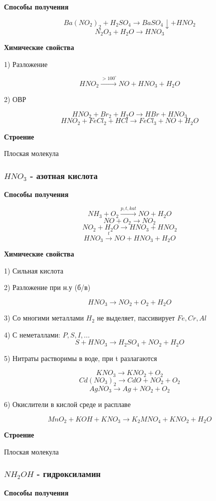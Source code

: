 \textbf{Способы получения}

$$Ba(NO_2)_2 + H_2SO_4 \rightarrow BaSO_4\downarrow + HNO_2$$
$$N_2O_3 + H_2O \rightarrow HNO_3$$

\textbf{Химические свойства}

1) Разложение

$$HNO_2 \xrightarrow{>100^{\circ}} NO + HNO_3 + H_2O$$

2) ОВР

$$HNO_2 + Br_2 + H_2O \rightarrow HBr + HNO_3$$
$$HNO_2 + FeCl_2 + HCl \rightarrow FeCl_3 + NO + H_2O$$

\textbf{Строение}

Плоская молекула

\subsubsection*{$HNO_3$ - азотная кислота}

\textbf{Способы получения}

$$NH_3 + O_2 \xrightarrow{p,t,kat} NO + H_2O$$
$$NO + O_2 \rightarrow NO_2$$
$$NO_2+H_2O \rightarrow HNO_3 + HNO_2$$
$$HNO_3 \xrightarrow{t} NO + HNO_3 + H_2O$$

\textbf{Химические свойства}

1) Сильная кислота

2) Разложение при н.у (б/в)

$$HNO_3 \rightarrow NO_2 + O_2 + H_2O$$

3) Со многими металлами $H_2$ не выделяет, пассивирует $Fe,Cr,Al$

4) С неметаллами: $P, S, I,...$
$$ S + HNO_3 \rightarrow H_2SO_4 + NO_2 + H_2O$$

5) Нитраты растворимы в воде, при t разлагаются

$$KNO_3 \rightarrow KNO_2 + O_2$$
$$Cd(NO_3)_2 \rightarrow CdO + NO_2 + O_2$$
$$AgNO_3 \rightarrow Ag + NO_2 + O_2$$

6) Окислители в кислой среде и расплаве

$$MnO_2 + KOH + KNO_3 \rightarrow K_2MNO_4 + KNO_2 + H_2O$$

\textbf{Строение}

Плоская молекула

\subsubsection*{$NH_2OH$ - гидроксиламин}

\textbf{Способы получения}

